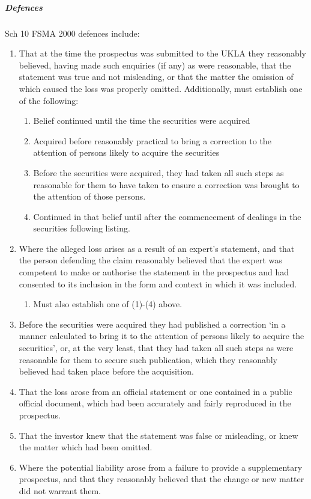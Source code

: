 \documentclass[
]{article}
\providecommand{\tightlist}{%
  \setlength{\itemsep}{0pt}\setlength{\parskip}{0pt}}
\begin{document}
\hypertarget{defences}{%
\subparagraph{Defences}\label{defences}}

Sch 10 FSMA 2000 defences include:

\begin{enumerate}
\def\labelenumi{\arabic{enumi}.}
\tightlist
\item
  That at the time the prospectus was submitted to the UKLA they
  reasonably believed, having made such enquiries (if any) as were
  reasonable, that the statement was true and not misleading, or that
  the matter the omission of which caused the loss was properly omitted.
  Additionally, must establish one of the following:

  \begin{enumerate}
  \def\labelenumii{\arabic{enumii}.}
  \tightlist
  \item
    Belief continued until the time the securities were acquired
  \item
    Acquired before reasonably practical to bring a correction to the
    attention of persons likely to acquire the securities
  \item
    Before the securities were acquired, they had taken all such steps
    as reasonable for them to have taken to ensure a correction was
    brought to the attention of those persons.
  \item
    Continued in that belief until after the commencement of dealings in
    the securities following listing.
  \end{enumerate}
\item
  Where the alleged loss arises as a result of an expert's statement,
  and that the person defending the claim reasonably believed that the
  expert was competent to make or authorise the statement in the
  prospectus and had consented to its inclusion in the form and context
  in which it was included.

  \begin{enumerate}
  \def\labelenumii{\arabic{enumii}.}
  \tightlist
  \item
    Must also establish one of (1)-(4) above.
  \end{enumerate}
\item
  Before the securities were acquired they had published a correction
  `in a manner calculated to bring it to the attention of persons likely
  to acquire the securities', or, at the very least, that they had taken
  all such steps as were reasonable for them to secure such publication,
  which they reasonably believed had taken place before the acquisition.
\item
  That the loss arose from an official statement or one contained in a
  public official document, which had been accurately and fairly
  reproduced in the prospectus.
\item
  That the investor knew that the statement was false or misleading, or
  knew the matter which had been omitted.
\item
  Where the potential liability arose from a failure to provide a
  supplementary prospectus, and that they reasonably believed that the
  change or new matter did not warrant them.
\end{enumerate}
\end{document}
